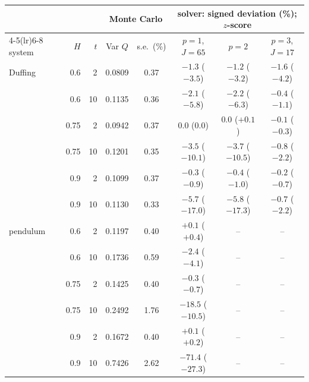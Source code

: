 \begin{tabular}{lrrccccc}\toprule
 & & & \multicolumn{2}{c}{Monte Carlo} & \multicolumn{3}{c}{solver: signed deviation (\%); $z$-score}\\\cmidrule(lr){4-5}\cmidrule(lr){6-8}
system & $H$ & $t$ & Var $Q$ & s.e.\ (\%) & $p=1$, $J=65$ & $p=2$ & $p=3$, $J=17$\\\midrule
Duffing & 0.6 & 2 & 0.0809 & 0.37 & $-1.3$ ($-3.5$) & $-1.2$ ($-3.2$) & $-1.6$ ($-4.2$)\\
 & 0.6 & 10 & 0.1135 & 0.36 & $-2.1$ ($-5.8$) & $-2.2$ ($-6.3$) & $-0.4$ ($-1.1$)\\
 & 0.75 & 2 & 0.0942 & 0.37 & $0.0$ ($0.0$) & $0.0$ ($+0.1$) & $-0.1$ ($-0.3$)\\
 & 0.75 & 10 & 0.1201 & 0.35 & $-3.5$ ($-10.1$) & $-3.7$ ($-10.5$) & $-0.8$ ($-2.2$)\\
 & 0.9 & 2 & 0.1099 & 0.37 & $-0.3$ ($-0.9$) & $-0.4$ ($-1.0$) & $-0.2$ ($-0.7$)\\
 & 0.9 & 10 & 0.1130 & 0.33 & $-5.7$ ($-17.0$) & $-5.8$ ($-17.3$) & $-0.7$ ($-2.2$)\\
\addlinespace
pendulum & 0.6 & 2 & 0.1197 & 0.40 & $+0.1$ ($+0.4$) & -- & --\\
 & 0.6 & 10 & 0.1736 & 0.59 & $-2.4$ ($-4.1$) & -- & --\\
 & 0.75 & 2 & 0.1425 & 0.40 & $-0.3$ ($-0.7$) & -- & --\\
 & 0.75 & 10 & 0.2492 & 1.76 & $-18.5$ ($-10.5$) & -- & --\\
 & 0.9 & 2 & 0.1672 & 0.40 & $+0.1$ ($+0.2$) & -- & --\\
 & 0.9 & 10 & 0.7426 & 2.62 & $-71.4$ ($-27.3$) & -- & --\\
\bottomrule\end{tabular}
